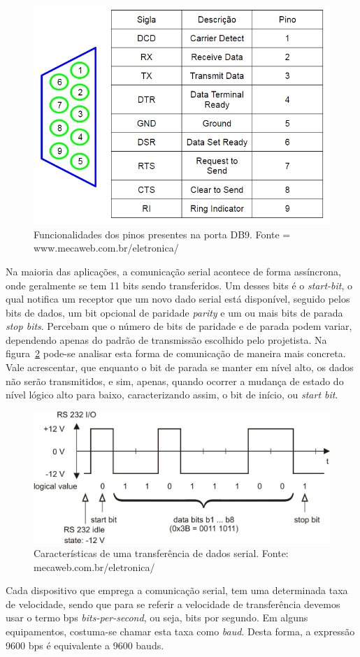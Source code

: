 \documentclass[12pt]{article}
\begin{document}
\begin{figure}[h]
\centering
\includegraphics[width=.5\textwidth]{img/Fig9serial_pinos.png}
\caption{Funcionalidades dos pinos presentes na porta DB9. Fonte = www.mecaweb.com.br/eletronica/}
\label{fig:pinosdb9}
\end{figure}



Na maioria das aplicações, a comunicação serial acontece de forma assíncrona, onde geralmente se tem 11 bits sendo transferidos. Um desses bits é o \textit{start-bit}, o qual notifica um receptor que um novo dado serial está disponível, seguido pelos bits de dados, um bit opcional de paridade \textit{parity} e um ou mais bits de parada \textit{stop bits}\cite{porta-serial}. Percebam que o número de bits de paridade e de parada podem variar, dependendo apenas do padrão de transmissão escolhido pelo projetista. Na figura~\ref{fig:cserial} pode-se analisar esta forma de comunicação de maneira mais concreta. Vale acrescentar, que enquanto o bit de parada se manter em nível alto, os dados não serão transmitidos, e sim, apenas, quando ocorrer a mudança de estado do nível lógico alto para baixo, caracterizando assim, o bit de início, ou \textit{start bit}. 


\begin{figure}[h]
\centering
\includegraphics[width=.5\textwidth]{img/Fig10rs232.jpg}
\caption{Características de uma transferência de dados serial. Fonte: mecaweb.com.br/eletronica/}
\label{fig:cserial}
\end{figure}



Cada dispositivo que emprega a comunicação serial, tem uma determinada taxa de velocidade, sendo que para se referir a velocidade de transferência devemos usar o termo bps \textit{bits-per-second}, ou seja, bits por segundo. Em alguns equipamentos, costuma-se chamar esta taxa  como \textit{baud}. Desta forma, a expressão 9600 bps é equivalente a 9600 bauds.
\end{document}
